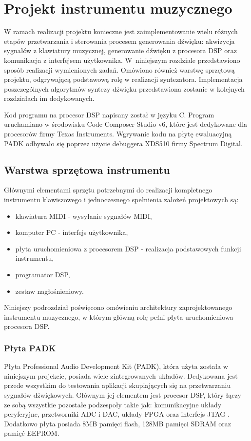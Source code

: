 \chapter{Projekt instrumentu muzycznego}
W ramach realizacji projektu konieczne jest zaimplementowanie wielu różnych etapów przetwarzania i sterowania procesem generowania dźwięku: akwizycja sygnałów z klawiatury muzycznej, generowanie dźwięku z procesora DSP oraz komunikacja z interfejsem użytkownika. W~niniejszym rozdziale przedstawiono sposób realizacji wymienionych zadań. Omówiono również warstwę sprzętową projektu, odgrywającą podstawową rolę w realizacji syntezatora. Implementacja poszczególnych algorytmów syntezy dźwięku przedstawiona zostanie w kolejnych rozdziałach im dedykowanych.

Kod programu na procesor DSP napisany został w języku C. Program uruchamiano w środowisku Code Composer Studio v6, które jest dedykowane dla procesorów firmy Texas Instruments. Wgrywanie kodu na płytę ewaluacyjną PADK odbywało się poprzez użycie debuggera XDS510 firmy Spectrum Digital.


\section{Warstwa sprzętowa instrumentu}
Głównymi elementami sprzętu potrzebnymi do realizacji kompletnego instrumentu klawiszowego i jednoczesnego spełnienia założeń projektowych są:
\begin{itemize}
	\item klawiatura MIDI - wysyłanie sygnałów MIDI,
	\item komputer PC - interfejs użytkownika,
	\item płyta uruchomieniowa z procesorem DSP - realizacja podstawowych funkcji instrumentu,
	\item programator DSP,
	\item zestaw nagłośnieniowy.
\end{itemize}

Niniejszy podrozdział poświęcono omówieniu architektury zaprojektowanego instrumentu muzycznego, w którym główną rolę pełni płyta uruchomieniowa procesora DSP.

\subsection{Płyta PADK}
Płyta Professional Audio Development Kit (PADK), która użyta została w niniejszym projekcie, posiada wiele zintegrowanych układów. Dedykowana jest przede wszystkim do testowania aplikacji skupiających się na przetwarzaniu sygnałów dźwiękowych. Głównym jej elementem jest procesor DSP, który łączy ze sobą wszystkie pozostałe podzespoły takie jak: komunikacyjne układy peryferyjne, przetworniki ADC i DAC, układy FPGA oraz interfejs JTAG \cite{dokumentacja_PADK}. Dodatkowo płyta posiada 8MB pamięci flash, 128MB pamięci SDRAM oraz pamięć EEPROM.

